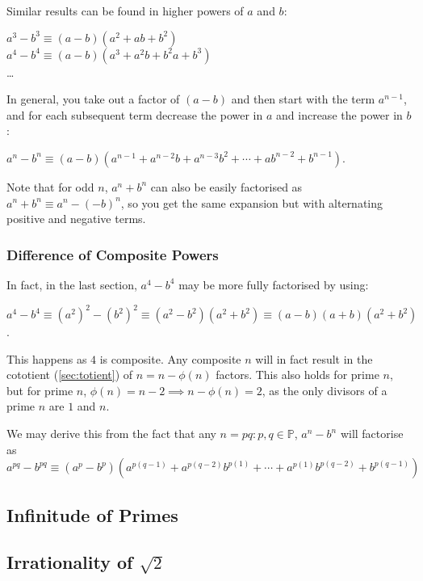 \documentclass[a4paper,11pt]{article}
\begin{document}
    Similar results can be found in higher powers of $a$ and $b$:

    $a^3 - b^3 \equiv (a - b)(a^2 + ab + b^2)$
    \\$a^4 - b^4 \equiv (a - b)(a^3 + a^2b + b^2a + b^3)$
    \\\ldots

    In general, you take out a factor of $(a - b)$ and then start with the term
    $a^{n - 1}$, and for each subsequent term decrease the power in $a$ and
    increase the power in $b$:

    $a^n - b^n \equiv (a - b)(a^{n - 1} + a^{n - 2}b + a^{n - 3}b^2 + \cdots +
                              ab^{n - 2} + b^{n - 1})$.

    Note that for odd $n$, $a^n + b^n$ can also be easily factorised as
    $a^n + b^n \equiv a^n - (-b)^n$, so you get the same expansion but with
    alternating positive and negative terms.


    \subsubsection{Difference of Composite Powers}

    In fact, in the last section, $a^4 - b^4$ may be more fully factorised by
    using:

    $a^4 - b^4 \equiv (a^2)^2 - (b^2)^2 \equiv (a^2 - b^2)(a^2 + b^2) \equiv
        (a - b)(a + b)(a^2 + b^2)$.

    This happens as $4$ is composite. Any composite $n$ will in fact result in
    the cototient (\ref{sec:totient}) of $n = n - \phi(n)$ factors. This also
    holds for prime $n$, but for prime
    $n$, $\phi(n) = n - 2 \implies n - \phi(n) = 2$, as the only divisors of
    a prime $n$ are $1$ and $n$.

    We may derive this from the fact that any $n = pq: p, q \in \mathbb{P}$,
    $a^n - b^n$ will factorise as
    \\$a^{pq} - b^{pq} \equiv
     (a^p - b^p)(a^{p(q - 1)} + a^{p(q - 2)}b^{p(1)} + \cdots +
                 a^{p(1)}b^{p(q - 2)} + b^{p(q - 1)})$

    \subsection{Infinitude of Primes}

    \subsection[Irrationality of $\sqrt 2$]{Irrationality of \boldmath$\sqrt 2$}
\end{document}
